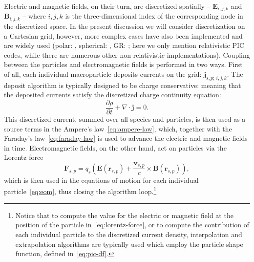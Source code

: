 Electric and magnetic fields, on their turn, are discretized spatially -- $\bm{E}_{i,j,k}$ and $\bm{B}_{i,j,k}$ -- where $i,j,k$ is the three-dimensional index of the corresponding node in the discretized space. In the present discussion we will consider discretization on a Cartesian grid, however, more complex cases have also been implemented and are widely used (polar: \citealt{2014ApJ...795L..22C, 2015NewA...36...37B}, spherical: \citealt{2019ascl.soft11012C}, GR: \citealt{2019PhRvL.122c5101P}; here we only mention relativistic PIC codes, while there are numerous other non-relativistic implementations). Coupling between the particles and electromagnetic fields is performed in two ways. First of all, each individual macroparticle deposits currents on the grid: $\bm{j}_{s,p;~i,j,k}$. The deposit algorithm is typically designed to be charge conservative: meaning that the deposited currents satisfy the discretized charge continuity equation:
\begin{equation}
  \label{eq:charge-continuity}
  \frac{\partial \rho}{\partial t} + \nabla\cdot \bm{j} = 0.
\end{equation}
\noindent This discretized current, summed over all species and particles, is then used as a source terms in the Ampere's law~\eqref{eq:ampere-law}, which, together with the Faraday's law~\ref{eq:faraday-law} is used to advance the electric and magnetic fields in time. Electromagnetic fields, on the other hand, act on particles via the Lorentz force
\begin{equation}
  \label{eq:lorentz-force}
  \bm{F}_{s,p} = q_s \left(\bm{E}(\bm{r}_{s,p}) + \frac{\bm{v}_{s,p}}{c}\times \bm{B}(\bm{r}_{s,p})\right),
\end{equation}
\noindent which is then used in the equations of motion for each individual particle~\eqref{eq:eom}, thus closing the algorithm loop.\footnote{Notice that to compute the value for the electric or magnetic field at the position of the particle in~\eqref{eq:lorentz-force}, or to compute the contribution of each individual particle to the discretized current density, interpolation and extrapolation algorithms are typically used which employ the particle shape function, defined in~\eqref{eq:pic-df}.}

